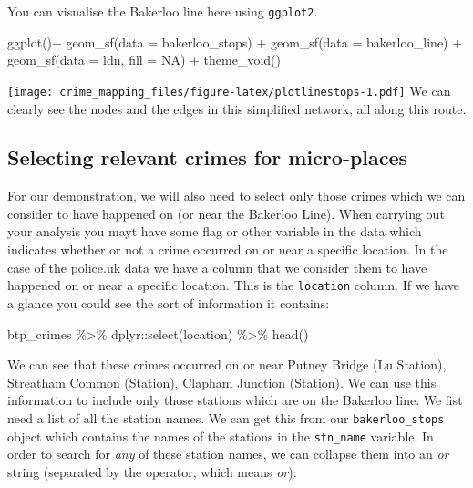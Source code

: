 \documentclass[
  krantz2]{krantz}
\makeatletter
\newenvironment{Shaded}{\begin{snugshade}}{\end{snugshade}}
\newcommand{\AttributeTok}[1]{\textcolor[rgb]{0.61,0.61,0.61}{#1}}
\newcommand{\ConstantTok}[1]{\textcolor[rgb]{0,0,0}{#1}}
\newcommand{\FunctionTok}[1]{\textcolor[rgb]{0,0,0}{#1}}
\newcommand{\NormalTok}[1]{#1}
\newcommand{\SpecialCharTok}[1]{\textcolor[rgb]{0,0,0}{#1}}
\newenvironment{kframe}{%
\medskip{}
\setlength{\fboxsep}{.8em}
 \def\at@end@of@kframe{}%
 \ifinner\ifhmode%
  \def\at@end@of@kframe{\end{minipage}}%
  \begin{minipage}{\columnwidth}%
 \fi\fi%
 \def\FrameCommand##1{\hskip\@totalleftmargin \hskip-\fboxsep
 \colorbox{shadecolor}{##1}\hskip-\fboxsep
     \hskip-\linewidth \hskip-\@totalleftmargin \hskip\columnwidth}%
 \MakeFramed {\advance\hsize-\width
   \@totalleftmargin\z@ \linewidth\hsize
   \@setminipage}}%
 {\par\unskip\endMakeFramed%
 \at@end@of@kframe}
\renewenvironment{Shaded}{\begin{kframe}}{\end{kframe}}
\makeatother
\begin{document}
You can visualise the Bakerloo line here using \texttt{ggplot2}.

\begin{Shaded}
\begin{Highlighting}[]
\FunctionTok{ggplot}\NormalTok{()}\SpecialCharTok{+} 
  \FunctionTok{geom\_sf}\NormalTok{(}\AttributeTok{data =}\NormalTok{ bakerloo\_stops) }\SpecialCharTok{+} 
  \FunctionTok{geom\_sf}\NormalTok{(}\AttributeTok{data =}\NormalTok{ bakerloo\_line) }\SpecialCharTok{+} 
  \FunctionTok{geom\_sf}\NormalTok{(}\AttributeTok{data =}\NormalTok{ ldn, }\AttributeTok{fill =} \ConstantTok{NA}\NormalTok{) }\SpecialCharTok{+} 
  \FunctionTok{theme\_void}\NormalTok{() }
\end{Highlighting}
\end{Shaded}

\texttt{[image: crime\_mapping\_files/figure-latex/plotlinestops-1.pdf]}
We can clearly see the nodes and the edges in this simplified network, all along this route.

\hypertarget{selecting-relevant-crimes-for-micro-places}{%
\subsection{Selecting relevant crimes for micro-places}\label{selecting-relevant-crimes-for-micro-places}}

For our demonstration, we will also need to select only those crimes which we can consider to have happened on (or near the Bakerloo Line). When carrying out your analysis you mayt have some flag or other variable in the data which indicates whether or not a crime occurred on or near a specific location. In the case of the police.uk data we have a column that we consider them to have happened on or near a specific location. This is the \texttt{location} column. If we have a glance you could see the sort of information it contains:

\begin{Shaded}
\begin{Highlighting}[]
\NormalTok{btp\_crimes }\SpecialCharTok{\%\textgreater{}\%}\NormalTok{ dplyr}\SpecialCharTok{::}\FunctionTok{select}\NormalTok{(location) }\SpecialCharTok{\%\textgreater{}\%} \FunctionTok{head}\NormalTok{()}
\end{Highlighting}
\end{Shaded}

We can see that these crimes occurred on or near Putney Bridge (Lu Station), Streatham Common (Station), Clapham Junction (Station). We can use this information to include only those stations which are on the Bakerloo line. We fist need a list of all the station names. We can get this from our \texttt{bakerloo\_stops} object which contains the names of the stations in the \texttt{stn\_name} variable. In order to search for \emph{any} of these station names, we can collapse them into an \emph{or} string (separated by the \texttt{\textbar{}} operator, which means \emph{or}):
\end{document}
